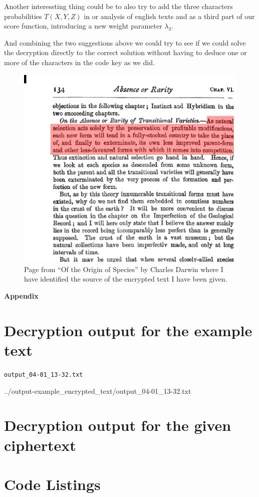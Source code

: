 \documentclass[a4paper, 11pt]{article}
\begin{document}
Another interessting thing could be to also try to add the three characters
probabilities $T(X,Y,Z)$ in or analysis of english texts and as a third part of
our score function, introducing a new weight parameter $\lambda_3$.

And combining the two suggestions above we could try to see if we could 
solve the decryption directly to the correct solution without having to 
deduce one or more of the characters in the code key as we did.

\begin{figure}[h!]
  \centering
  \includegraphics[width=1.0\textwidth]{decrypted_text_source_Darwin_OriginOfSpieces.eps}
  \caption{Page from ``Of the Origin of Species'' by Charles Darwin where I
  have identified the source of the encrypted text I have been given.}
  \label{fig:Darwin}
\end{figure}



\newpage

\begin{appendix}

  {\huge{\bf Appendix}}
  
  \section{Decryption output for the example text}
 
  \verb+output_04-01_13-32.txt+
  
  {../output-example_encrypted_text/output_04-01_13-32.txt}

  \section{Decryption output for the given ciphertext}
  
  \section{Code Listings}
\end{appendix}
\end{document}
